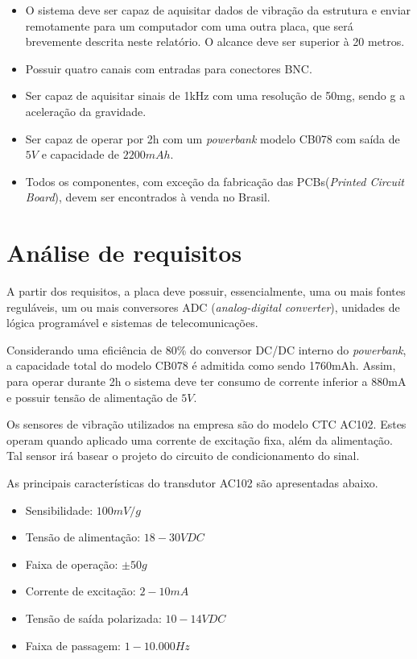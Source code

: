 \documentclass[11pt]{abntex2}
\begin{document}
			\begin{itemize}
				\item O sistema deve ser capaz de aquisitar dados de vibração da
				estrutura e enviar remotamente para um computador com uma outra
				placa, que será brevemente descrita neste relatório. O alcance
				deve ser superior à 20 metros.
				
				\item Possuir quatro canais com entradas para conectores BNC.
				
				\item Ser capaz de aquisitar sinais de 1kHz com uma resolução de 50mg, sendo g
				a aceleração da gravidade.
				
				\item Ser capaz de operar por 2h com um \textit{powerbank} modelo CB078 com saída de $5V$
				e capacidade de $2200mAh$.
				
				\item Todos os componentes, com exceção da fabricação das
				PCBs(\textit{Printed Circuit Board}), devem ser encontrados à
				venda no Brasil.
			\end{itemize}

		\section{Análise de requisitos}
		
			A partir dos requisitos, a placa deve possuir, essencialmente, uma
			ou mais fontes reguláveis, um ou mais conversores ADC
			(\textit{analog-digital converter}), unidades de lógica programável
			e sistemas de telecomunicações.

			Considerando uma eficiência de 80\% do conversor DC/DC interno do
			\textit{powerbank}, a capacidade total do modelo CB078 é admitida como sendo
			1760mAh. Assim, para operar durante 2h o sistema deve ter consumo de
			corrente inferior a 880mA e possuir tensão de alimentação de $5V$.
			
			Os sensores de vibração utilizados na empresa são do modelo CTC
			AC102. Estes operam quando aplicado uma corrente de excitação fixa,
			além da alimentação. Tal sensor irá basear o projeto do circuito de
			condicionamento do sinal.
			
			As principais características do transdutor AC102 são apresentadas
			abaixo.\cite{ctc}
			
			\begin{itemize}
				\item Sensibilidade: $100mV/g$
				\item Tensão de alimentação: $18 - 30 VDC$
				\item Faixa de operação: $\pm 50g$
				\item Corrente de excitação: $2 - 10mA$
				\item Tensão de saída polarizada: $10 - 14 VDC$
				\item Faixa de passagem: $1 - 10.000 Hz$
			\end{itemize}
			
\end{document}
